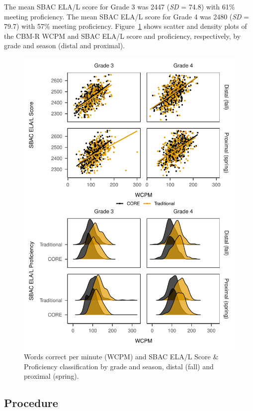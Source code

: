\documentclass[
  english,
  man, fleqn, noextraspace]{apa6}
\begin{document}
The mean SBAC ELA/L score for Grade 3 was 2447 (\emph{SD} = 74.8) with 61\% meeting proficiency. The mean SBAC ELA/L score for Grade 4 was 2480 (\emph{SD} = 79.7) with 57\% meeting proficiency. Figure~\ref{fig:fig-sbac-scatter} shows scatter and density plots of the CBM-R WCPM and SBAC ELA/L score and proficiency, respectively, by grade and season (distal and proximal).



\begin{figure}
\centering
\includegraphics{conseq_validity_manusript_files/figure-latex/fig-sbac-scatter-1.pdf}
\caption{\label{fig:fig-sbac-scatter}Words correct per minute (WCPM) and SBAC ELA/L Score \& Proficiency classification by grade and season, distal (fall) and proximal (spring).}
\end{figure}

\hypertarget{procedure}{%
\subsection{Procedure}\label{procedure}}
\end{document}
